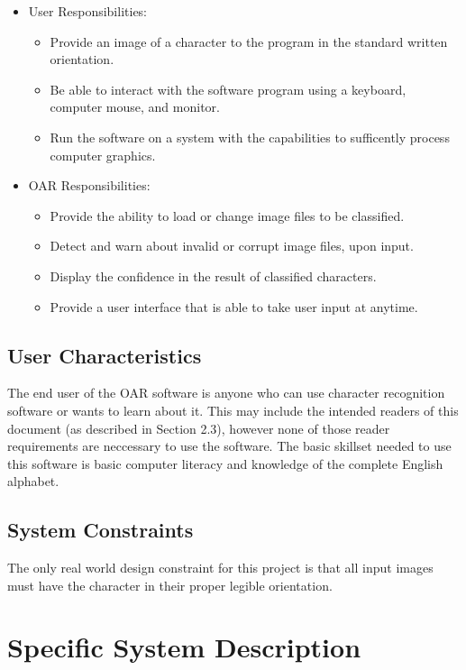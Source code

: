 \documentclass[12pt]{article}
\begin{document}
\begin{itemize}
\item User Responsibilities:
\begin{itemize}
\item Provide an image of a character to the program in the standard written orientation.
\item Be able to interact with the software program using a keyboard, computer mouse, and monitor.
\item Run the software on a system with the capabilities to sufficently process computer graphics.
\end{itemize}
\item OAR Responsibilities:
\begin{itemize}
\item Provide the ability to load or change image files to be classified.
\item Detect and warn about invalid or corrupt image files, upon input.
\item Display the confidence in the result of classified characters.
\item Provide a user interface that is able to take user input at anytime.
\end{itemize}
\end{itemize}

\subsection{User Characteristics} \label{SecUserCharacteristics}

The end user of the OAR software is anyone who can use character recognition software or wants to learn about it. This may include 
the intended readers of this document (as described in Section 2.3), however none of those reader requirements are neccessary 
to use the software. The basic skillset needed to use this software is basic computer literacy and knowledge of the complete English alphabet.

\subsection{System Constraints}

The only real world design constraint for this project is that all input images must have the character in their proper legible
orientation.

\section{Specific System Description}
\end{document}
